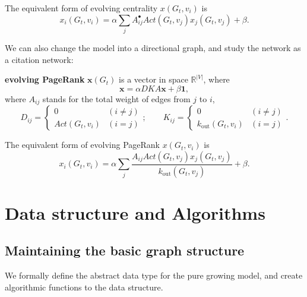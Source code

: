 \documentclass[12pt,abstract=true]{scrartcl}
\numberwithin{equation}{section}
\theoremstyle{definition}   \newtheorem{definition}{Definition}[section]
\theoremstyle{plain}        \newtheorem{theorem}{Theorem}[section]
\theoremstyle{plain}        \newtheorem{observation}{Observation}[section]
\theoremstyle{plain}        \newtheorem{fact}{Fact}[section]
\theoremstyle{plain}        \newtheorem{claim}{Claim}[section]
\theoremstyle{plain}        \newtheorem{lemma}[theorem]{Lemma}
\theoremstyle{plain}        \newtheorem{corollary}[theorem]{Corollary}
\theoremstyle{remark}       \newtheorem{example}{Example}[section]
\theoremstyle{remark}       \newtheorem{remark}{Remark}[section]
\begin{document}
The equivalent form of evolving centrality $x(G_t,v_i)$ is 
\begin{equation}
x_i(G_t,v_i)=\alpha\sum_jA^\bullet_{ij}
\mathit{Act}(G_t,v_j)x_j(G_t,v_j)+\beta.
\end{equation}

We can also change the model into a directional graph, and study the network as
a citation network:

 \textbf{evolving PageRank} $\textbf{x}(G_t)$ is a vector in space
$\mathbb{R}^{|V|}$, where
\begin{equation}
\mathbf{x}=\alpha DKA \mathbf{x} + \beta\mathbf{1},
\end{equation}
where $A_{ij}$ stands for the total weight of edges from $j$ to $i$,
\begin{equation}
D_{ij}=\begin{cases}
0&(i\neq j)\\
\mathit{Act}(G_t,v_i)&(i=j)
\end{cases};\qquad
K_{ij}=\begin{cases}
0&(i\neq j)\\
k_{\mathrm{out}}(G_t,v_i)&(i=j)
\end{cases}.
\end{equation}

The equivalent form of evolving PageRank $x(G_t,v_i)$ is 
\begin{equation}
x_i(G_t,v_i)=\alpha\sum_j
\frac{A_{ij}\mathit{Act}(G_t,v_j)x_j(G_t,v_j)}{k_{\mathrm{out}}(G_t,v_j)}
+\beta.
\end{equation}

\section{Data structure and Algorithms}
\subsection{Maintaining the basic graph structure}
We formally define the abstract data type for the pure growing model, and
create algorithmic functions to the data structure.
\end{document}
